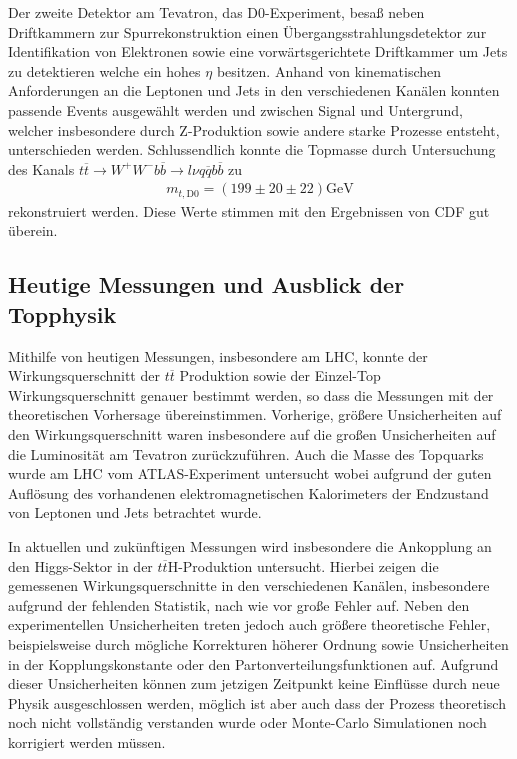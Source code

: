 Der zweite Detektor am Tevatron, das D0-Experiment, besaß neben Driftkammern zur Spurrekonstruktion einen Übergangsstrahlungsdetektor zur Identifikation von Elektronen sowie eine vorwärtsgerichtete Driftkammer um Jets zu detektieren welche ein hohes $\eta$ besitzen.
Anhand von kinematischen Anforderungen an die Leptonen und Jets in den verschiedenen Kanälen konnten passende Events ausgewählt werden und zwischen Signal und Untergrund, welcher insbesondere durch Z-Produktion sowie andere starke Prozesse entsteht, unterschieden werden.
Schlussendlich konnte die Topmasse durch Untersuchung des Kanals $t\overline{t} \rightarrow W^+ W^- b \overline{b} \rightarrow l \nu q \overline{q} b \overline{b}$ zu
\begin{align*}
	m_{t, \text{D0}} = \left( 199 \pm 20 \pm 22 \right)\si{\giga\electronvolt}
\end{align*}
rekonstruiert werden.
Diese Werte stimmen mit den Ergebnissen von CDF gut überein.

\subsection{Heutige Messungen und Ausblick der Topphysik}
\label{sec:higgs}

Mithilfe von heutigen Messungen, insbesondere am LHC, konnte der Wirkungsquerschnitt der $t\overline{t}$ Produktion sowie der Einzel-Top Wirkungsquerschnitt genauer bestimmt werden, so dass die Messungen mit der theoretischen Vorhersage übereinstimmen.
Vorherige, größere Unsicherheiten auf den Wirkungsquerschnitt waren insbesondere auf die großen Unsicherheiten auf die Luminosität am Tevatron zurückzuführen.
Auch die Masse des Topquarks wurde am LHC vom ATLAS-Experiment untersucht wobei aufgrund der guten Auflösung des vorhandenen elektromagnetischen Kalorimeters der Endzustand von Leptonen und Jets betrachtet wurde.

In aktuellen und zukünftigen Messungen wird insbesondere die Ankopplung an den Higgs-Sektor in der $t \overline{t} \text{H}$-Produktion untersucht.
Hierbei zeigen die gemessenen Wirkungsquerschnitte in den verschiedenen Kanälen, insbesondere aufgrund der fehlenden Statistik, nach wie vor große Fehler auf.
Neben den experimentellen Unsicherheiten treten jedoch auch größere theoretische Fehler, beispielsweise durch mögliche Korrekturen höherer Ordnung sowie Unsicherheiten in der Kopplungskonstante oder den Partonverteilungsfunktionen auf.
Aufgrund dieser Unsicherheiten können zum jetzigen Zeitpunkt keine Einflüsse durch neue Physik ausgeschlossen werden, möglich ist aber auch dass der Prozess theoretisch noch nicht vollständig verstanden wurde oder Monte-Carlo Simulationen noch korrigiert werden müssen.